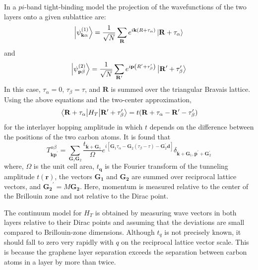 In a $pi$-band tight-binding model the projection of the wavefunctions of the two layers onto a given sublattice are:
\begin{equation}
	\ket{\psi_{\mathbf{k} \alpha}^{(1)}}=\frac{1}{\sqrt{N}} \sum_{\mathbf{R}} e^{i \mathbf{k}\left(R+\tau_{\alpha}\right)}\ket{\mathbf{R}+\tau_{\alpha}}
\end{equation}
and
\begin{equation}
	\ket{\psi_{\mathbf{p} \beta}^{(2)}}=\frac{1}{\sqrt{N}} \sum_{\mathbf{R}^{\prime}} e^{i \mathbf{p}\left(R^{\prime}+\tau_{\beta}^{\prime}\right)}\ket{\mathbf{R}^{\prime}+\tau_{\beta}^{\prime}}
\end{equation}
In this case, $\tau_{\alpha}=0$, $\tau_{\beta}=\tau$, and $\mathbf{R}$ is summed over the triangular Bravais lattice. Using the above equations and the two-center approximation,
\begin{equation}
	\mel{\mathbf{R}+\tau_{\alpha}}{H_T}{\mathbf{R}^\prime +\tau_{\beta}^\prime}=t(\mathbf{R}+\tau_{\alpha}-\mathbf{R}^\prime - \tau_{\beta}^\prime)
\end{equation}
for the interlayer hopping amplitude in which $t$ depends on the difference between the positions of the two carbon atoms. It is found that
\begin{equation}
	T_{\mathbf{k p}^{\prime}}^{\alpha \beta}=\sum_{\mathbf{G}_{1} \mathbf{G}_{2}} \frac{t_{\overline{\mathbf{k}}+\mathbf{G}_{1}}}{\Omega} e^{i\left[\mathbf{G}_{1} \tau_{\alpha}-\mathbf{G}_{2}\left(\tau_{\beta}-\tau\right)-\mathbf{G}_{2}^{\prime} \mathbf{d}\right]} \delta_{\overline{\mathbf{k}}+\mathbf{G}_{1}, \overline{\mathbf{p}}^{\prime}+\mathbf{G}_{2}^{\prime}}
\end{equation}
where, $\Omega$ is the unit cell area, $t_{\mathbf{q}}$ is the Fourier transform of the tunneling amplitude $t(\mathbf{r})$, the vectors $\mathbf{G_1}$ and $\mathbf{G_2}$ are summed over reciprocal lattice vectors, and $\mathbf{G_2}^\prime = M \mathbf{G_2}$. Here, momentum is measured relative to the center of the Brillouin zone and not relative to the Dirac point.

The continuum model for $H_T$ is obtained by measuring wave vectors in both layers relative to their Dirac points and assuming that the deviations are small compared to Brillouin-zone dimensions. Although $t_q$ is not precisely known, it should fall to zero very rapidly with $q$ on the reciprocal lattice vector scale. This is because the graphene layer separation exceeds the separation between carbon atoms in a layer by more than twice.

